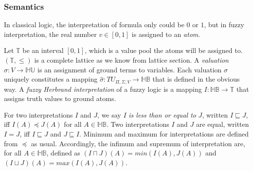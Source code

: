 \subsubsection{Semantics}
\label{sec:FLSemantics}
In classical logic, the interpretation of formula only could be $0$ or $1$, but in fuzzy interpretation, the real number $v \in [0,1]$ is assigned to an \textit{atom}.

Let $\mathbb{T}$ be an interval $[0,1]$, which is a value pool the atoms will be assigned to. 
$(\mathbb{T},\leq)$ is a complete lattice as we know from lattice section.
A \textit{valuation} $\sigma : V \rightarrow \mathbb{HU}$ is an assignment of ground terms to variables. Each valuation $\sigma$ uniquely constitutes a mapping 
$\hat{\sigma} : TU_{\Pi,\Sigma,V} \rightarrow \mathbb{HB}$ that is defined in the obvious way.
A \textit{fuzzy Herbrand interpretation} of a fuzzy logic is a mapping 
$I: \mathbb{HB} \rightarrow \mathbb{T}$ that assigns truth values to ground atoms.

For two interpretations $I$ and $J$, we say $I$ \textit{is less than or equal to} $J$, written $I \sqsubseteq J$, iff $I(A) \preceq J(A)$ for all $A \in \mathbb{HB}$. Two interpretations $I$ and $J$ are equal, written $I = J$, iff $I \sqsubseteq J$ and $J \sqsubseteq I$. Minimum and maximum for interpretations are defined from $\preceq$ as usual.
Accordingly, the infimum and supremum of interpretation are, for all $A \in \mathbb{HB}$, defined as $(I \sqcap J)(A) = min(I(A),J(A))$ and $(I \sqcup J)(A) = max(I(A),J(A))$.